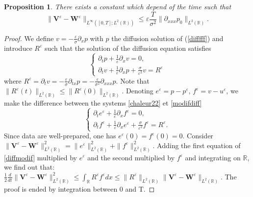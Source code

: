 \documentclass[a4paper,french,english,10pt]{article}
\newcommand\eps{\varepsilon}
\newcommand{\dt}{\partial_t}
\newcommand\V{\mathbf{V}}
\newcommand\W{\mathbf{W}}
\newtheorem{proposition}[theorem]{Proposition}
\begin{document}
\begin{proposition} \label{heqtode}
There exists a constant which depend of the time such that 
\begin{equation*}
\|\V^{\eps}-\W^\eps\|_{L^\infty([0,T];L^2(\mathbb{R}) )} \leq
 \eps \frac{T}{\sigma^2} \|\partial_{xxx}p_0\|_{L^2(\mathbb{R})}.
\end{equation*}
\end{proposition}
\begin{proof}
We define $v=-\frac{\varepsilon}\sigma \partial_x p$ with $p$ the diffusion solution of (\ref{difffff}) and
introduce $R^{\eps}$ such that the solution of the diffusion equation satisfies
\begin{equation}\label{modifdiff}
\left \{
\begin{array}{lll}
\dt p +\frac{1}{\eps}\partial_{x}v=0,\\
\partial_t v+ \frac{1}{\eps}\partial_x p +\frac{\sigma}{\eps^2}v = R^{\eps}
\end{array}
\right.
\end{equation}
where
 $R^{\eps}=\dt v=-\frac{\varepsilon}\sigma \partial_{tx} p=
-\frac{\varepsilon}{\sigma^2} \partial_{xxx}p$. 
Note that 
$\|R^{\eps}(t)\|_{L^2(\mathbb{R})}\leq \|R^{\eps}(0)\|_{L^2(\mathbb{R})}$. 
Denoting $e^{\eps}=p-p^{\eps}$, $f^{\eps}=v-u^{\eps}$, we make the difference between the
systems \eqref{chaleur22} et \eqref{modifdiff}
\begin{equation}\label{diffmodif}
\left \{
\begin{array}{lll}
\dt e^{\eps} +\frac{1}{\eps}\partial_{x}f^{\eps}=0,\\
\partial_t f^{\eps} +\frac{1}{\eps}\partial_x e^{\eps} +\frac{\sigma}{\eps^2}f^{\eps} = R^{\eps}.
\end{array}
\right.
\end{equation}
Since data are well-prepared, one has $e^{\eps}(0)=f^{\eps}(0)=0$.
Consider
$\|\V^{\eps}-\W^\eps\|_{L^2(\mathbb{R})}^2=\|e^{\eps}\|_{L^2(\mathbb{R})}
^2+\|f^{\eps}\|_{L^2(\mathbb{R})}^2$.
Adding the first equation of
\eqref{diffmodif} multiplied by $e^{\eps}$ and the second multiplied by $f^{\eps}$ and integrating
on $\mathbb{R}$,
 we find out that:
$\frac12 \frac{d}{dt}\|\V^{\eps}-\W^\eps\|_{L^2(\mathbb{R})}^2 \leq
\int_{\mathbb{R}}R^{\eps}f^{\eps} dx \leq  \|R^{\eps}\|_{L^2(\mathbb{R})}
\|\V^{\eps}-\W^\eps\|_{L^2(\mathbb{R})}
.$
  The proof is ended by integration between 0 and T.

\end{proof}
\end{document}
